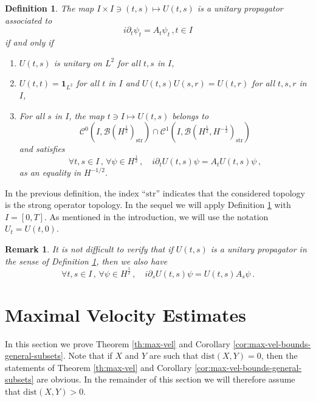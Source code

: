 \documentclass[12pt]{article}
\theoremstyle{plain}
\newtheorem{rem}[theo]{Remark}
\newtheorem{definition}[theo]{Definition}
\begin{document}
 
\begin{definition}\label{def_propagator}
The map $I\times I \ni (t,s)\mapsto U(t,s)$ is a \emph{unitary propagator} associated to
\begin{equation}
                i\partial_t \psi_t = A_t \psi_t\,,  t\in I
 \label{Cauchy-pb-propagateur}
\end{equation}
if and only if
\begin{enumerate}
    \item $U(t,s)$ is unitary on $L^2$ for all $t,s$ in $I$,
    \item $U(t,t)=\mathbf{1}_{L^2}$ for all $t$ in $I$ and $U(t,s)U(s,r)=U(t,r)$ for all $t,s,r$ in $I$,
    \item For all $s$ in $I$, the map $t\ni I \mapsto U(t,s)$ belongs to 
    \begin{equation*}
        \mathcal{C}^0(I,\mathcal{B}(H^{\frac12})_{\mathrm{str}}) \cap \mathcal{C}^1(I,\mathcal{B}(H^{\frac12},H^{-\frac12})_{\mathrm{str}})
    \end{equation*}
    and satisfies
    \[\forall t,s\in I\,,\,\forall \psi \in H^{\frac12}\,, \quad i\partial_t U(t,s)\psi = A_t U(t,s)\psi\,,\]
    as an equality in $H^{-1/2}$.
\end{enumerate}
\end{definition}
In the previous definition, the index ``$\mathrm{str}$'' indicates that the considered topology is the strong operator topology.
In the sequel we will apply Definition \ref{def_propagator} with $I=[0,T]$. As mentioned in the introduction, we will use the notation $U_t=U(t,0)$.

\begin{rem}
    It is not difficult to verify that if $U(t,s)$ is a unitary propagator in the sense of Definition \ref{def_propagator}, then we also have
    \begin{equation*}
        \forall t,s\in I\,,\,\forall \psi \in H^{\frac12}\,, \quad i\partial_s U(t,s)\psi = U(t,s)A_s\psi\,.
    \end{equation*}
\end{rem}



\section{Maximal Velocity Estimates}\label{sec:max-vel-estimates}
In this section we prove Theorem \ref{th:max-vel} and Corollary \ref{cor:max-vel-bounds-general-subsets}. Note that if $X$ and $Y$ are such that $\mathrm{dist}(X,Y)=0$, then the statements of Theorem \ref{th:max-vel} and Corollary \ref{cor:max-vel-bounds-general-subsets} are obvious. In the remainder of this section we will therefore assume that $\mathrm{dist}(X,Y)>0$.
\end{document}
